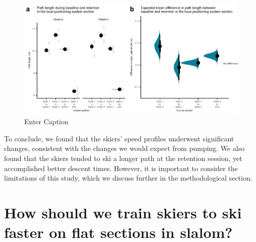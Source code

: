 \begin{figure}
    \centering
    \includegraphics[width=1\linewidth]{figure/figure_path5.pdf}
    \caption{Enter Caption}
    \label{fig:lps_path}
\end{figure}




To conclude, we found that the skiers' speed profiles underwent significant changes, consistent with the changes we would expect from pumping. We also found that the skiers tended to ski a longer path at the retention session, yet accomplished better descent times. However, it is important to consider the limitations of this study, which we discuss further in the methodological section. 

\section{How should we train skiers to ski faster on flat sections in slalom?}


